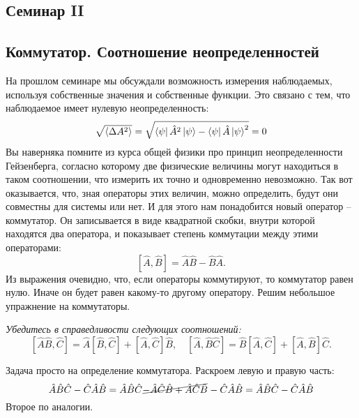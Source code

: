\begin{center}
    \section{Семинар II}
\end{center}
\subsection{Коммутатор. Соотношение неопределенностей}
\hspace{1em} На прошлом семинаре мы обсуждали возможность измерения наблюдаемых, используя собственные значения и собственные функции. Это связано с тем, что наблюдаемое имеет нулевую неопределенность: 
\[
\sqrt{\langle\Delta A^2 \rangle} = \sqrt{\bra{\psi}\hat{A}^2\ket{\psi} - \bra{\psi}\hat{A}\ket{\psi}^2} = 0
\]
Вы наверняка помните из курса общей физики про принцип неопределенности Гейзенберга, согласно которому две физические величины могут находиться в таком соотношении, что измерить их точно и одновременно невозможно. Так вот оказывается, что, зная операторы этих величин, можно определить, будут они совместны для системы или нет. И для этого нам понадобится новый оператор -- коммутатор. Он записывается в виде квадратной скобки, внутри которой находятся два оператора, и показывает степень коммутации между этими операторами:
\[
[\hat{A}, \hat{B}] = \hat{A}\hat{B} - \hat{B}\hat{A}.
\]
Из выражения очевидно, что, если операторы коммутируют, то коммутатор равен нулю. Иначе он будет равен какому-то другому оператору. Решим небольшое упражнение на коммутаторы.
\begin{center}
\textit{Убедитесь в справедливости следующих соотношений:}
\[
[\hat A \hat B, \hat C] = \hat A [\hat B, \hat C] + [\hat A, \hat C]\hat B, \quad [\hat A, \hat B \hat C] = \hat B [\hat A, \hat C] + [\hat A, \hat B] \hat C.
\]
\end{center}
Задача просто на определение коммутатора. Раскроем левую и правую часть:
\[
\hat A \hat B \hat C - \hat C \hat A \hat B = \hat A \hat B \hat C \hcancel{$- \hat A \hat C \hat B + \hat A \hat C \hat B$} - \hat C \hat A \hat B = \hat A \hat B \hat C - \hat C \hat A \hat B
\]
Второе по аналогии.

